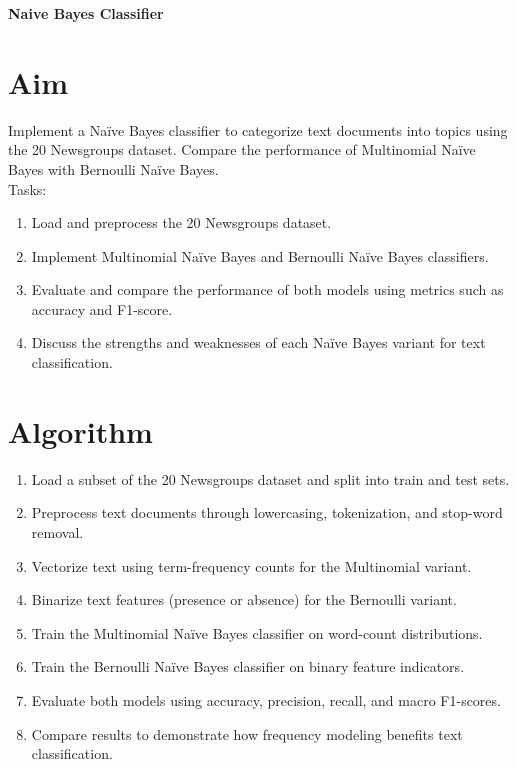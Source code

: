\documentclass[12pt, a4paper]{report}
\begin{document}
\label{exp:5}
\begin{center}
	{\bfseries \Huge Naive Bayes Classifier}	
\end{center}

\section*{Aim} 
Implement a Naïve Bayes classifier to categorize text documents into topics using the 20 Newsgroups dataset.
Compare the performance of Multinomial Naïve Bayes with Bernoulli Naïve Bayes. \\
Tasks:
\begin{enumerate}[\quad -]
	\itemsep 0em 
	
	\item Load and preprocess the 20 Newsgroups dataset.
	\item Implement Multinomial Naïve Bayes and Bernoulli Naïve Bayes classifiers.
	\item Evaluate and compare the performance of both models using metrics such as accuracy and F1-score.
	\item Discuss the strengths and weaknesses of each Naïve Bayes variant for text classification.
\end{enumerate}

\section*{Algorithm} 
\begin{enumerate}
	\item Load a subset of the 20 Newsgroups dataset and split into train and test sets.
	\item Preprocess text documents through lowercasing, tokenization, and stop-word removal.
	\item Vectorize text using term-frequency counts for the Multinomial variant.
	\item Binarize text features (presence or absence) for the Bernoulli variant.
	\item Train the Multinomial Naïve Bayes classifier on word-count distributions.
	\item Train the Bernoulli Naïve Bayes classifier on binary feature indicators.
	\item Evaluate both models using accuracy, precision, recall, and macro F1-scores.
	\item Compare results to demonstrate how frequency modeling benefits text classification.
\end{enumerate}
\end{document}
